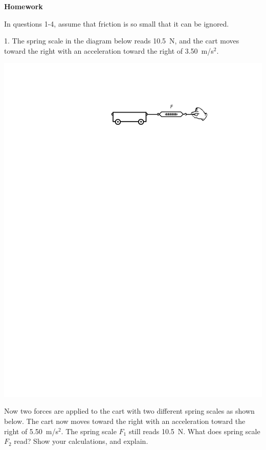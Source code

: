 \textbf{Homework}

In questions 1-4, assume that friction is so small that it can be ignored.

1. The spring scale in the diagram below reads 10.5~N, and 
the cart moves toward the right with an acceleration toward the right of 3.50~m/s$^2$. 

\begin{center}
\includegraphics{force_mass/cart_plus_scale.pdf}
\end{center}

Now two forces are applied to the cart with two different spring scales
as shown below. The cart now moves toward the right with an acceleration toward the right of
5.50~m/s$^2$. The spring scale \( F_{1} \) still reads 10.5~N. 
What does spring scale \( F_{2} \) read? Show your calculations,
and explain.

